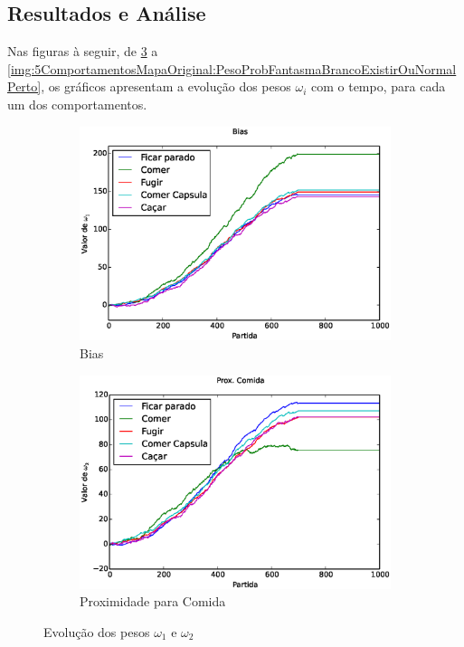 \subsection{Resultados e Análise}

Nas figuras à seguir, de \ref{img:5ComportamentosMapaOriginal:PesoBiasAndDistComida} a \ref{img:5ComportamentosMapaOriginal:PesoProbFantasmaBrancoExistirOuNormalPerto}, os gráficos apresentam a evolução dos pesos $ \omega_i $ com o tempo, para cada um dos comportamentos.

\begin{figure}[h]
	\centering
	\begin{subfigure}[t]{.5\textwidth}
		\centering
		\includegraphics[width=\linewidth]{images/5_behaviors_original_map/weights____pol__Bias}
		\caption{Bias}
		\label{img:5ComportamentosMapaOriginal:PesoBias}
	\end{subfigure}%
	\begin{subfigure}[t]{.5\textwidth}
		\centering
		\includegraphics[width=\linewidth]{images/5_behaviors_original_map/weights____pol__DistComida}
		\caption{Proximidade para Comida}
		\label{img:5ComportamentosMapaOriginal:PesoDistComida}
	\end{subfigure}
	\caption{Evolução dos pesos $ \omega_1 $ e $ \omega_2 $}
	\label{img:5ComportamentosMapaOriginal:PesoBiasAndDistComida}
\end{figure}

